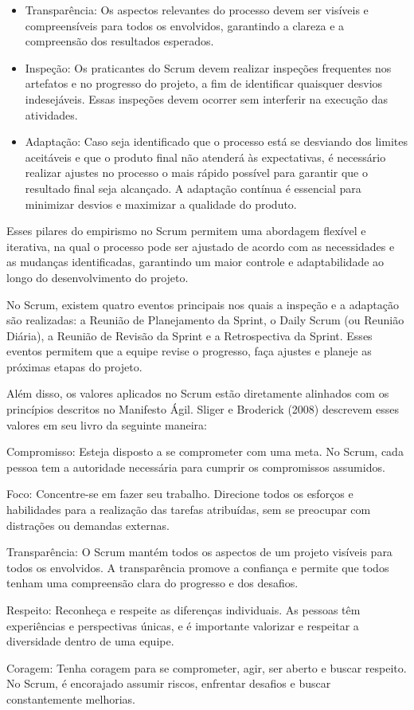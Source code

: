 \begin{itemize}
	\item Transparência: Os aspectos relevantes do processo devem ser visíveis e compreensíveis para todos os envolvidos, garantindo a clareza e a compreensão dos resultados esperados.
	\item Inspeção: Os praticantes do Scrum devem realizar inspeções frequentes nos artefatos e no progresso do projeto, a fim de identificar quaisquer desvios indesejáveis. Essas inspeções devem ocorrer sem interferir na execução das atividades.
	\item Adaptação: Caso seja identificado que o processo está se desviando dos limites aceitáveis e que o produto final não atenderá às expectativas, é necessário realizar ajustes no processo o mais rápido possível para garantir que o resultado final seja alcançado. A adaptação contínua é essencial para minimizar desvios e maximizar a qualidade do produto.
\end{itemize}

Esses pilares do empirismo no Scrum permitem uma abordagem flexível e iterativa, na qual o processo pode ser ajustado de acordo com as necessidades e as mudanças identificadas, garantindo um maior controle e adaptabilidade ao longo do desenvolvimento do projeto.

No Scrum, existem quatro eventos principais nos quais a inspeção e a adaptação são realizadas: a Reunião de Planejamento da Sprint, o Daily Scrum (ou Reunião Diária), a Reunião de Revisão da Sprint e a Retrospectiva da Sprint. Esses eventos permitem que a equipe revise o progresso, faça ajustes e planeje as próximas etapas do projeto.

Além disso, os valores aplicados no Scrum estão diretamente alinhados com os princípios descritos no Manifesto Ágil. Sliger e Broderick (2008) descrevem esses valores em seu livro da seguinte maneira:

\begin{alineas}
	\item Compromisso: Esteja disposto a se comprometer com uma meta. No Scrum, cada pessoa tem a autoridade necessária para cumprir os compromissos assumidos.
	\item Foco: Concentre-se em fazer seu trabalho. Direcione todos os esforços e habilidades para a realização das tarefas atribuídas, sem se preocupar com distrações ou demandas externas.
	\item Transparência: O Scrum mantém todos os aspectos de um projeto visíveis para todos os envolvidos. A transparência promove a confiança e permite que todos tenham uma compreensão clara do progresso e dos desafios.
	\item Respeito: Reconheça e respeite as diferenças individuais. As pessoas têm experiências e perspectivas únicas, e é importante valorizar e respeitar a diversidade dentro de uma equipe.
	\item Coragem: Tenha coragem para se comprometer, agir, ser aberto e buscar respeito. No Scrum, é encorajado assumir riscos, enfrentar desafios e buscar constantemente melhorias.
\end{alineas}

